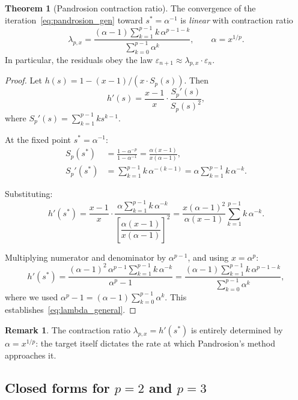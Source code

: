 \documentclass[11pt,a4paper]{article}
\theoremstyle{definition}
\newtheorem{theorem}{Theorem}[section]
\newtheorem{remark}{Remark}[section]
\newcommand{\eps}{\varepsilon}
\begin{document}
\begin{theorem}[Pandrosion contraction ratio]
\label{thm:lambda}
The convergence of the iteration~\eqref{eq:pandrosion_gen} toward $s^* = \alpha^{-1}$ is \emph{linear} with contraction ratio
\begin{equation}
  \label{eq:lambda_general}
  \boxed{
  \lambda_{p,x} = \frac{(\alpha - 1)\displaystyle\sum_{k=1}^{p-1} k\,\alpha^{p-1-k}}{\displaystyle\sum_{k=0}^{p-1} \alpha^k}
  }, \qquad \alpha = x^{1/p}.
\end{equation}
In particular, the residuals obey the law $\eps_{n+1} \approx \lambda_{p,x} \cdot \eps_n$.
\end{theorem}

\begin{proof}
Let $h(s) = 1 - (x-1)/(x \cdot S_p(s))$. Then
\[
  h'(s) = \frac{x-1}{x} \cdot \frac{S_p'(s)}{S_p(s)^2},
\]
where $S_p'(s) = \sum_{k=1}^{p-1} k s^{k-1}$.

At the fixed point $s^* = \alpha^{-1}$:
\begin{align*}
  S_p(s^*) &= \frac{1 - \alpha^{-p}}{1 - \alpha^{-1}} = \frac{\alpha(x-1)}{x(\alpha-1)}, \\
  S_p'(s^*) &= \sum_{k=1}^{p-1} k\,\alpha^{-(k-1)} = \alpha \sum_{k=1}^{p-1} k\,\alpha^{-k}.
\end{align*}

Substituting:
\[
  h'(s^*) = \frac{x-1}{x} \cdot \frac{\alpha \sum_{k=1}^{p-1} k\,\alpha^{-k}}{\left[\dfrac{\alpha(x-1)}{x(\alpha-1)}\right]^2}
  = \frac{x(\alpha-1)^2}{\alpha(x-1)} \sum_{k=1}^{p-1} k\,\alpha^{-k}.
\]

Multiplying numerator and denominator by $\alpha^{p-1}$, and using $x = \alpha^p$:
\[
  h'(s^*) = \frac{(\alpha-1)^2\,\alpha^{p-1}\sum_{k=1}^{p-1}k\,\alpha^{-k}}{\alpha^p - 1}
  = \frac{(\alpha-1)\sum_{k=1}^{p-1}k\,\alpha^{p-1-k}}{\sum_{k=0}^{p-1}\alpha^k},
\]
where we used $\alpha^p - 1 = (\alpha-1)\sum_{k=0}^{p-1}\alpha^k$. This establishes~\eqref{eq:lambda_general}.
\end{proof}

\begin{remark}
The contraction ratio $\lambda_{p,x} = h'(s^*)$ is entirely determined by $\alpha = x^{1/p}$: the target itself dictates the rate at which Pandrosion's method approaches it.
\end{remark}

\subsection{Closed forms for \texorpdfstring{$p=2$}{p=2} and \texorpdfstring{$p=3$}{p=3}}
\end{document}
